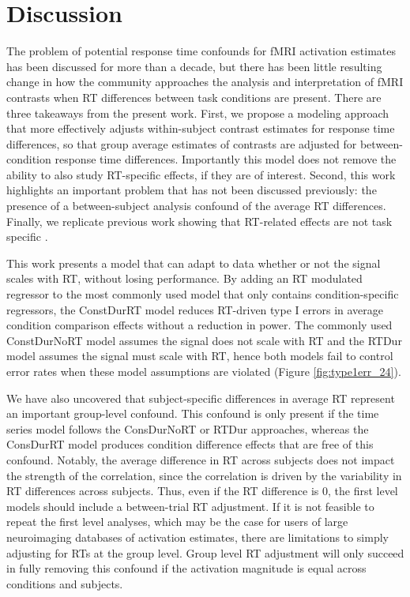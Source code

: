 \documentclass[titlepage,12pt] {article}
\begin{document}
\section*{Discussion}

The problem of potential response time confounds for fMRI activation estimates has been discussed for more than a decade, but there has been little resulting change in how the community approaches the analysis and interpretation of fMRI contrasts when RT differences between task conditions are present.  There are three takeaways from the present work.  First, we propose a modeling approach that more effectively adjusts within-subject contrast estimates for response time differences, so that group average estimates of contrasts are adjusted for between-condition response time differences.  Importantly this model does not remove the ability to also study RT-specific effects, if they are of interest.  Second, this work highlights an important problem that has not been discussed previously: 
the presence of a between-subject analysis confound of the average RT differences.  Finally, we replicate previous work showing that RT-related effects are not task specific \citep{yarkoni_bold_2009}.

This work presents a model that can adapt to data whether or not the signal scales with RT, without losing performance. By adding an RT modulated regressor to the most commonly used model that only contains condition-specific regressors, the ConstDurRT model reduces RT-driven type I errors in average condition comparison effects without a reduction in power.  The commonly used ConstDurNoRT model assumes the signal does not scale with RT and the RTDur model assumes the signal must scale with RT, hence both models fail to control error rates when these model assumptions are violated (Figure \ref{fig:type1err_24}).  


We have also uncovered that subject-specific differences in average RT represent an important group-level confound.  This confound is only present if the time series model follows the ConsDurNoRT or RTDur approaches, whereas the ConsDurRT model produces condition difference effects that are free of this confound.  Notably, the average difference in RT across subjects does not impact the strength of the correlation, since the correlation is driven by the variability in RT differences across subjects.  Thus, even if the RT difference is 0, the first level models should include a between-trial RT adjustment.  If it is not feasible to repeat the first level analyses, which may be the case for users of large neuroimaging databases of activation estimates, there are limitations to simply adjusting for RTs at the group level. Group level RT adjustment will only succeed in fully removing this confound if the activation magnitude is equal across conditions and subjects.
\end{document}
